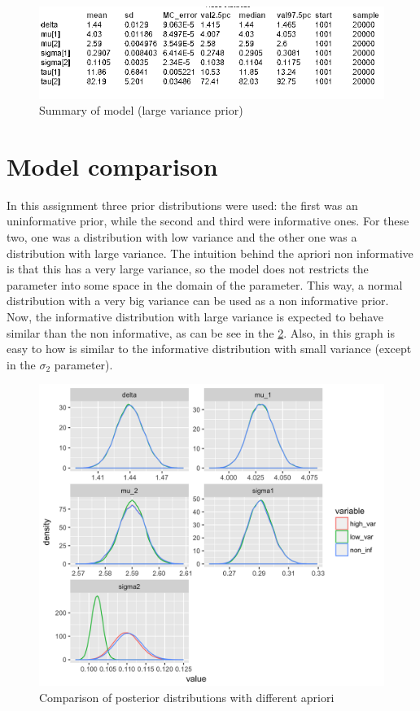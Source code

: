 \documentclass{article}
\begin{document}
\begin{figure}[ht!]
  \centering
  \includegraphics[width=.8\textwidth]{imgs/Inf_high_table.png}
  \caption{Summary of model (large variance prior)}
  \label{fig:fig13}
\end{figure}

\pagebreak

\section{Model comparison}
In this assignment three prior distributions were used: the first was an uninformative prior, while the second and third were informative ones. For these two, one was a distribution with low variance and the other one was a distribution with large variance. The intuition behind the apriori non informative is that this has a very large variance, so the model does not restricts the parameter into some space in the domain of the parameter. This way, a normal distribution with a very big variance can be used as a non informative prior. Now, the informative distribution with large variance is expected to behave similar than the non informative, as can be see in the \cref{fig:fig14}. Also, in this graph is easy to how is similar to the informative distribution with small variance (except in the $\sigma_2$ parameter).

\begin{figure}[ht!]
  \centering
  \includegraphics[width=.8\textwidth]{imgs/comparison.png}
  \caption{Comparison of posterior distributions with different apriori}
  \label{fig:fig14}
\end{figure}
\end{document}
